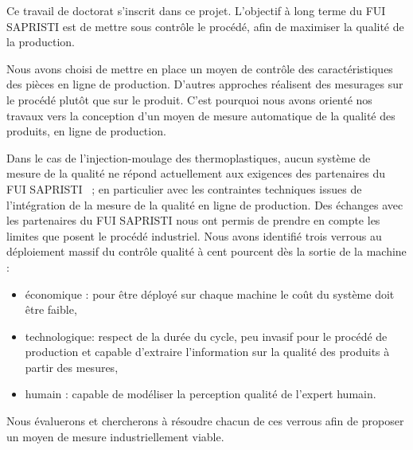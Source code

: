 Ce travail de doctorat s'inscrit dans ce projet.
L'objectif à long terme du FUI SAPRISTI est de mettre sous contrôle le procédé, afin de maximiser la qualité de la production.

Nous avons choisi de mettre en place un moyen de contrôle des caractéristiques des pièces en ligne de production.
D'autres approches réalisent des mesurages sur le procédé plutôt que sur le produit.
C'est pourquoi nous avons orienté nos travaux vers la conception d'un moyen de mesure automatique de la qualité des produits, en ligne de production.

Dans le cas de l’injection-moulage des thermoplastiques, aucun système de mesure de la qualité ne répond actuellement aux exigences des partenaires du FUI SAPRISTI \ ; en particulier avec les contraintes techniques issues de l'intégration de la mesure de la qualité en ligne de production.
Des échanges avec les partenaires du FUI SAPRISTI nous ont permis de prendre en compte les limites que posent le procédé industriel.
Nous avons identifié trois verrous au déploiement massif du contrôle qualité à cent pourcent dès la sortie de la machine :
\begin{itemize}
	\item économique : pour être déployé sur chaque machine le coût du système doit être faible,
	\item technologique: respect de la durée du cycle, peu invasif pour le procédé de production et capable d'extraire l'information sur la qualité des produits à partir des mesures,
	\item humain : capable de modéliser la perception qualité de l'expert humain.
\end{itemize}
Nous évaluerons et chercherons à résoudre chacun de ces verrous afin de proposer un moyen de mesure industriellement viable.

